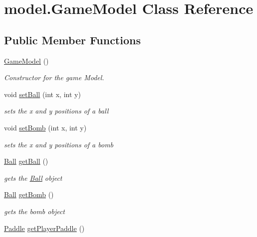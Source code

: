 \hypertarget{classmodel_1_1_game_model}{}\section{model.\+Game\+Model Class Reference}
\label{classmodel_1_1_game_model}
\subsection*{Public Member Functions}
\begin{DoxyCompactItemize}
\item 
\hyperlink{classmodel_1_1_game_model_a9b1b28ce881943f0f4035cf5fbd3860d}{Game\+Model} ()
\begin{DoxyCompactList}\small\item\em Constructor for the game Model. \end{DoxyCompactList}\item 
void \hyperlink{classmodel_1_1_game_model_a76b4c67d259ce96f0bd20f6c27284ac0}{set\+Ball} (int x, int y)
\begin{DoxyCompactList}\small\item\em sets the x and y positions of a ball \end{DoxyCompactList}\item 
void \hyperlink{classmodel_1_1_game_model_af426dea55d8fff1227dea8bb74530611}{set\+Bomb} (int x, int y)
\begin{DoxyCompactList}\small\item\em sets the x and y positions of a bomb \end{DoxyCompactList}\item 
\hyperlink{classmodel_1_1_ball}{Ball} \hyperlink{classmodel_1_1_game_model_a8523896367260852dad583e37651f87c}{get\+Ball} ()
\begin{DoxyCompactList}\small\item\em gets the \hyperlink{classmodel_1_1_ball}{Ball} object \end{DoxyCompactList}\item 
\hyperlink{classmodel_1_1_ball}{Ball} \hyperlink{classmodel_1_1_game_model_aa53f717eeb13366ffe506363efd1637f}{get\+Bomb} ()
\begin{DoxyCompactList}\small\item\em gets the bomb object \end{DoxyCompactList}\item 
\hyperlink{classmodel_1_1_paddle}{Paddle} \hyperlink{classmodel_1_1_game_model_a8bdb8971824c753c8074ccc0fadf56fc}{get\+Player\+Paddle} ()

\end{DoxyCompactItemize}
